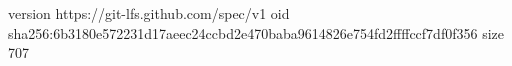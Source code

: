 version https://git-lfs.github.com/spec/v1
oid sha256:6b3180e572231d17aeec24ccbd2e470baba9614826e754fd2ffffccf7df0f356
size 707
